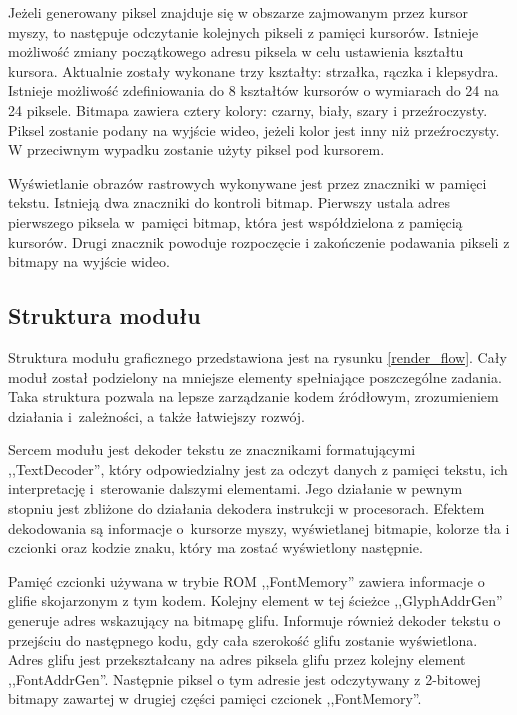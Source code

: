 Jeżeli generowany piksel znajduje się w obszarze zajmowanym przez kursor myszy, to następuje odczytanie kolejnych pikseli z pamięci kursorów. Istnieje możliwość zmiany początkowego adresu piksela w celu ustawienia kształtu kursora. Aktualnie zostały wykonane trzy kształty: strzałka, rączka i klepsydra. Istnieje możliwość zdefiniowania do 8 kształtów kursorów o wymiarach do 24 na 24 piksele. Bitmapa zawiera cztery kolory: czarny, biały, szary i przeźroczysty. Piksel zostanie podany na wyjście wideo, jeżeli kolor jest inny niż przeźroczysty. W przeciwnym wypadku zostanie użyty piksel pod kursorem.


Wyświetlanie obrazów rastrowych wykonywane jest przez znaczniki w pamięci tekstu. Istnieją dwa znaczniki do kontroli bitmap. Pierwszy ustala adres pierwszego piksela w~pamięci bitmap, która jest współdzielona z pamięcią kursorów. Drugi znacznik powoduje rozpoczęcie i zakończenie podawania pikseli z bitmapy na wyjście wideo.


\subsection{Struktura modułu}


Struktura modułu graficznego przedstawiona jest na rysunku \ref{render_flow}. Cały moduł został podzielony na mniejsze elementy spełniające poszczególne zadania. Taka struktura pozwala na lepsze zarządzanie kodem źródłowym, zrozumieniem działania i~zależności, a także łatwiejszy rozwój.

Sercem modułu jest dekoder tekstu ze znacznikami formatującymi ,,TextDecoder'', który odpowiedzialny jest za odczyt danych z pamięci tekstu, ich interpretację i~sterowanie dalszymi elementami. Jego działanie w pewnym stopniu jest zbliżone do działania dekodera instrukcji w procesorach. Efektem dekodowania są informacje o~kursorze myszy, wyświetlanej bitmapie, kolorze tła i czcionki oraz kodzie znaku, który ma zostać wyświetlony następnie.

Pamięć czcionki używana w trybie ROM ,,FontMemory'' zawiera informacje o glifie skojarzonym z tym kodem. Kolejny element w tej ścieżce ,,GlyphAddrGen'' generuje adres wskazujący na bitmapę glifu. Informuje również dekoder tekstu o przejściu do następnego kodu, gdy cała szerokość glifu zostanie wyświetlona. Adres glifu jest przekształcany na adres piksela glifu przez kolejny element ,,FontAddrGen''. Następnie piksel o tym adresie jest odczytywany z 2-bitowej bitmapy zawartej w drugiej części pamięci czcionek ,,FontMemory''.

